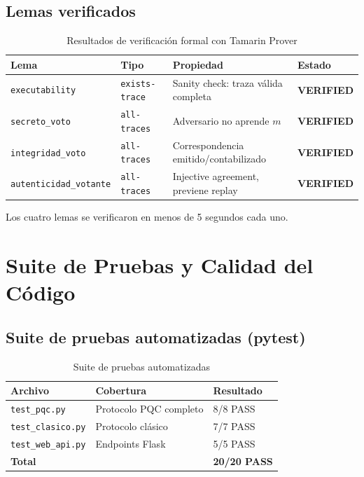 \documentclass[12pt,a4paper,twoside,openright]{book}
\theoremstyle{plain}
\theoremstyle{definition}
\theoremstyle{remark}
\begin{document}
\section{Lemas verificados}

\begin{table}[H]
\centering
\caption{Resultados de verificaci\'on formal con Tamarin Prover}
\label{tab:tamarin}
\begin{tabular}{llll}
\toprule
\textbf{Lema} & \textbf{Tipo} & \textbf{Propiedad} & \textbf{Estado} \\
\midrule
\texttt{executability} & \texttt{exists-trace} &
  Sanity check: traza v\'alida completa & \textbf{VERIFIED} \\
\texttt{secreto\_voto} & \texttt{all-traces} &
  Adversario no aprende $m$ & \textbf{VERIFIED} \\
\texttt{integridad\_voto} & \texttt{all-traces} &
  Correspondencia emitido/contabilizado & \textbf{VERIFIED} \\
\texttt{autenticidad\_votante} & \texttt{all-traces} &
  Injective agreement, previene replay & \textbf{VERIFIED} \\
\bottomrule
\end{tabular}
\end{table}

Los cuatro lemas se verificaron en menos de 5 segundos cada uno.

\chapter{Suite de Pruebas y Calidad del C\'odigo}
\label{chap:pruebas}

\section{Suite de pruebas automatizadas (pytest)}

\begin{table}[H]
\centering
\caption{Suite de pruebas automatizadas}
\label{tab:tests}
\begin{tabular}{lll}
\toprule
\textbf{Archivo} & \textbf{Cobertura} & \textbf{Resultado} \\
\midrule
\texttt{test\_pqc.py} & Protocolo PQC completo & 8/8 PASS \\
\texttt{test\_clasico.py} & Protocolo cl\'asico & 7/7 PASS \\
\texttt{test\_web\_api.py} & Endpoints Flask & 5/5 PASS \\
\midrule
\textbf{Total} & & \textbf{20/20 PASS} \\
\bottomrule
\end{tabular}
\end{table}
\end{document}
